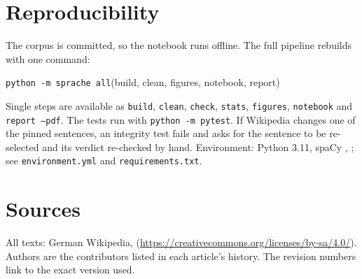 \documentclass[11pt,a4paper]{article}
\newcommand{\code}[1]{\texttt{#1}}
\begin{document}
\section{Reproducibility}\label{sec:repro}
The corpus is committed, so the notebook runs offline. The full pipeline rebuilds with one command:
\begin{center}\code{python -m sprache all}\quad(build, clean, figures, notebook, report)\end{center}
Single steps are available as \code{build}, \code{clean}, \code{check}, \code{stats}, \code{figures}, \code{notebook} and \code{report --pdf}. The tests run with \code{python -m pytest}. If Wikipedia changes one of the pinned sentences, an integrity test fails and asks for the sentence to be re-selected and its verdict re-checked by hand. Environment: Python 3.11, spaCy \SpacyVersion, \code{\ModelName} \ModelVersion; see \code{environment.yml} and \code{requirements.txt}.

\appendix
\section{Sources}\label{app:sources}
All texts: German Wikipedia, \Licence{} (\url{https://creativecommons.org/licenses/by-sa/4.0/}). Authors are the contributors listed in each article's history. The revision numbers link to the exact version used.
{\footnotesize}
\end{document}
